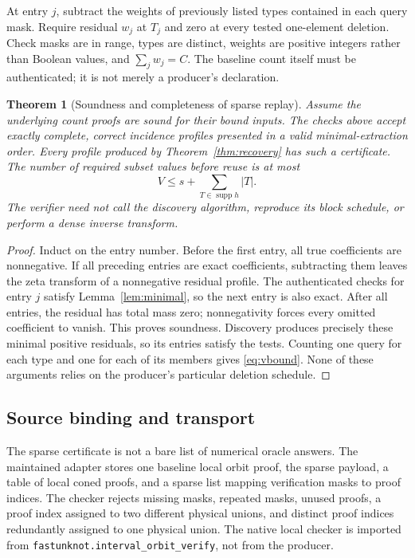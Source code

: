 \documentclass[11pt]{article}
\newtheorem{theorem}{Theorem}[section]
\theoremstyle{definition}
\newcommand{\supp}{\operatorname{supp}}
\begin{document}
At entry $j$, subtract the weights of previously listed types contained in
each query mask. Require residual $w_j$ at $T_j$ and zero at every tested
one-element deletion. Check masks are in range, types are distinct,
weights are positive integers rather than Boolean values, and
$\sum_jw_j=C$. The baseline count itself must be authenticated; it is not
merely a producer's declaration.

\begin{theorem}[Soundness and completeness of sparse replay]
\label{thm:cert}
Assume the underlying count proofs are sound for their bound inputs.
The checks above accept exactly complete, correct incidence profiles
presented in a valid minimal-extraction order. Every profile produced by
Theorem~\ref{thm:recovery} has such a certificate. The number of required
subset values before reuse is at most
\begin{equation}
 V\leq s+\sum_{T\in\supp h}|T|.
 \label{eq:vbound}
\end{equation}
The verifier need not call the discovery algorithm, reproduce its block
schedule, or perform a dense inverse transform.
\end{theorem}
\begin{proof}
Induct on the entry number. Before the first entry, all true coefficients
are nonnegative. If all preceding entries are exact coefficients, subtracting
them leaves the zeta transform of a nonnegative residual profile.
The authenticated checks for entry $j$ satisfy
Lemma~\ref{lem:minimal}, so the next entry is also exact. After all entries,
the residual has total mass zero; nonnegativity forces every omitted
coefficient to vanish. This proves soundness. Discovery produces precisely
these minimal positive residuals, so its entries satisfy the tests. Counting
one query for each type and one for each of its members gives
\eqref{eq:vbound}. None of these arguments relies on the producer's
particular deletion schedule.
\end{proof}

\subsection{Source binding and transport}
The sparse certificate is not a bare list of numerical oracle answers.
The maintained adapter stores one baseline local orbit proof, the sparse
payload, a table of local coned proofs, and a sparse list mapping verification
masks to proof indices. The checker rejects missing masks, repeated masks,
unused proofs, a proof index assigned to two different physical unions,
and distinct proof indices redundantly assigned to one physical union.
The native local checker is imported from
\texttt{fastunknot.interval\_orbit\_verify}, not from the producer.
\end{document}
